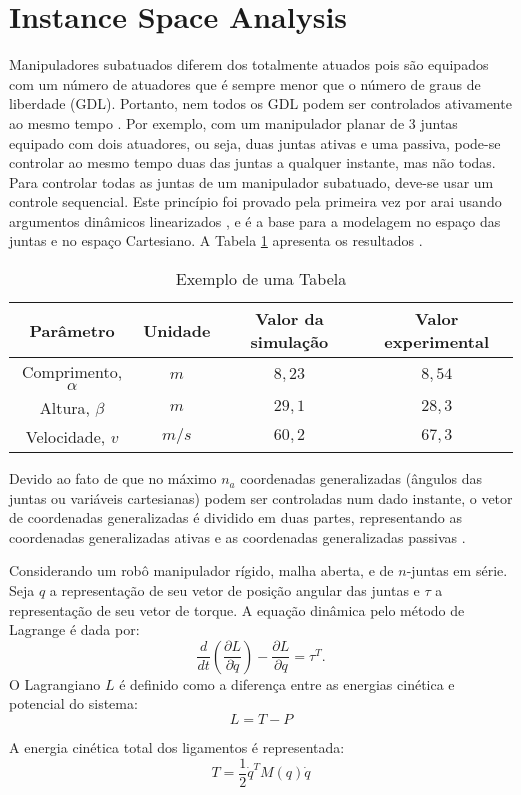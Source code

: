 \section{Instance Space Analysis}
Manipuladores subatuados diferem dos totalmente atuados pois são equipados com um número de atuadores que é sempre menor que o número de graus de liberdade (GDL). Portanto, nem todos os GDL podem ser controlados ativamente ao mesmo tempo \cite{Sbornian2004}. Por exemplo, com um manipulador planar de 3 juntas equipado com dois atuadores, ou seja, duas juntas ativas e
uma passiva, pode-se controlar ao mesmo tempo duas das juntas a qualquer instante, mas não todas. Para controlar todas as juntas de um manipulador subatuado, deve-se usar um controle sequencial. Este princípio foi provado pela primeira vez por {arai} usando  argumentos dinâmicos linearizados \cite{Joea2003}, e é a base para a modelagem no espaço das juntas e no espaço Cartesiano. A Tabela \ref{minhatab} apresenta os resultados \cite{Assenmacher1993,Silberschatz1991,Munoz2018}.

\begin{table}
\caption{Exemplo de uma Tabela}
\label{minhatab}

\center
\begin{tabular}{cccc}
  \hline
	Parâmetro & Unidade & Valor da simulação & Valor experimental   \\
	\hline
  Comprimento, $\alpha$ & $m$ &  $8,23$  & $8,54$ \\
  Altura, $\beta$ & $m$     &  $29,1$ & $28,3$\\
	Velocidade, $v$ & $m/s$  &  $60,2$ & $67,3$\\
	\hline
\end{tabular}
\end{table}

Devido ao fato de que no máximo $n_{a}$ coordenadas generalizadas (ângulos das juntas ou variáveis cartesianas) podem ser controladas num dado instante, o vetor de coordenadas generalizadas é dividido em duas partes, representando as coordenadas generalizadas ativas e as coordenadas generalizadas passivas \cite{Callaghan1995}.

Considerando um robô manipulador rígido, malha aberta, e de $n$-juntas em série. Seja $q$ a representação de seu vetor de posição angular das juntas  e $\tau$ a representação de seu vetor de torque. A equação dinâmica pelo método de
Lagrange é dada por:
\begin{equation} \label{eq:lagr1}
\frac{d}{dt}(\frac{\partial L}{\partial \dot{q}})-\frac{\partial L}{\partial q}=\tau^{T}.
\end{equation}
O Lagrangiano $L$ é definido como a diferença entre as energias cinética e potencial do sistema:
\begin{equation} \label{L}
L=T-P
\end{equation}

A energia cinética total dos ligamentos é representada:
\begin{equation} \label{energT}
T=\frac{1}{2}\dot{q}^{T}M(q)\dot{q}
\end{equation}
